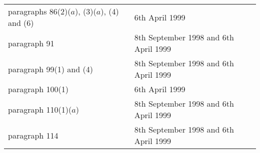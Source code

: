 \documentclass[12pt,a4paper]{article}
\begin{document}
{\begin{longtable}{p{265pt}p{110pt}}
\hspace{1em} paragraphs 86(2)($a$), (3)($a$), (4) and (6)&6th April 1999\\
\hspace{1em} paragraph 91&8th September 1998 and 6th April 1999\\
\hspace{1em} paragraph 99(1) and (4)&8th September 1998 and 6th April 1999\\
\hspace{1em} paragraph 100(1)&6th April 1999\\
\hspace{1em} paragraph 110(1)($a$)&8th September 1998 and 6th April 1999\\
\hspace{1em} paragraph 114&8th September 1998 and 6th April 1999\\
  \end{longtable}

}
\end{document}
